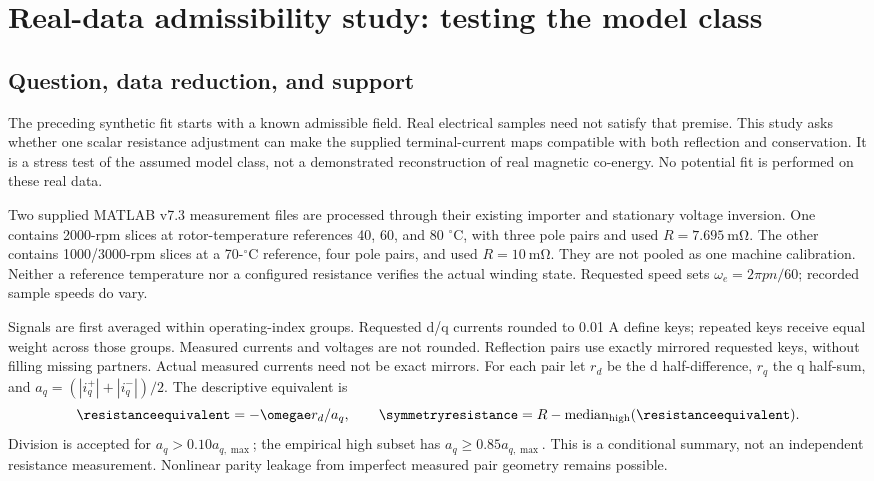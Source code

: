 \section{Real-data admissibility study: testing the model class}
\label{sec:real-admissibility}
\subsection{Question, data reduction, and support}
The preceding synthetic fit starts with a known admissible field. Real
electrical samples need not satisfy that premise. This study asks whether
one scalar resistance adjustment can make the supplied terminal-current
maps compatible with both reflection and conservation. It is a stress test
of the assumed model class, not a demonstrated reconstruction of real
magnetic co-energy. No potential fit is performed on these real data.

Two supplied MATLAB v7.3 measurement files are processed through their
existing importer and stationary voltage inversion. One contains 2000-rpm
slices at rotor-temperature references 40, 60, and 80 $^\circ$C, with three
pole pairs and used $R=\SI{7.695}{\milli\ohm}$. The other contains 1000/3000-rpm
slices at a 70-$^\circ$C reference, four pole pairs, and used
$R=\SI{10}{\milli\ohm}$. They are not pooled as one machine calibration.
Neither a reference temperature nor a configured resistance verifies the
actual winding state. Requested speed sets $\omega_e=2\pi pn/60$; recorded
sample speeds do vary.

Signals are first averaged within operating-index groups. Requested d/q
currents rounded to 0.01 A define keys; repeated keys receive equal weight
across those groups. Measured currents and voltages are not rounded.
Reflection pairs use exactly mirrored requested keys, without filling
missing partners. Actual measured currents need not be exact mirrors.
For each pair let $r_d$ be the d half-difference, $r_q$ the q half-sum,
and $a_q=(|i_q^+|+|i_q^-|)/2$. The descriptive equivalent is
\begin{equation}
 \resistanceequivalent=-\omegae r_d/a_q,\qquad
 \symmetryresistance=R-\operatorname{median}_{\rm high}
                      (\resistanceequivalent).
 \label{eq:real-sym-equivalent}
\end{equation}
Division is accepted for $a_q>0.10a_{q,\max}$; the empirical high subset has
$a_q\ge0.85a_{q,\max}$. This is a conditional summary, not an independent
resistance measurement. Nonlinear parity leakage from imperfect measured
pair geometry remains possible.

